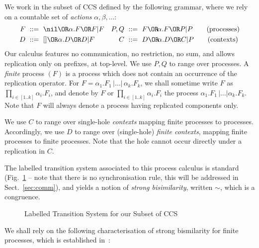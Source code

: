 \documentclass{llncs}
\begin{document}
We work in the subset of CCS defined by the following grammar, where
we rely on a countable set of \emph{actions} $\alpha,\beta,\dots$:
\begin{align*}
  F ~&::=~ \nil \OR \alpha.F \OR F|F &
  P,Q ~&::=~ F \OR \!\alpha.F \OR P|P \tag{processes}\\
  D ~&::=~ [] \OR \alpha.D \OR D|F &
  C ~&::=~ D \OR \!\alpha.D \OR C|P \tag{contexts}
\end{align*}
Our calculus features no communication, no restriction, no sum, and
allows replication only on prefixes, at top-level. We use $P,Q$ to
range over processes. A \emph{finite} process $(F)$ is a process which
does not contain an occurrence of the replication operator.
For $F=\alpha_1.F_1\,|\dots|\,\alpha_k.F_k$, we shall sometime write $F$ as
$\prod_{i\in[1..k]} \alpha_i.F_i$, and denote by $\!F$ or
$\prod_{i\in[1..k]} \!\alpha_i.F_i$ the process
$\!\alpha_1.F_1\,|\dots|\!\alpha_k.F_k$.
Note that $\!F$ will always denote a process having replicated
components only.

We use $C$ to range over single-hole \emph{contexts} mapping finite
processes to processes. Accordingly, we use $D$ to range over
(single-hole) \emph{finite contexts}, mapping finite processes to
finite processes. Note that the hole cannot occur directly under a
replication in $C$.


The labelled transition system associated to this process calculus is
standard (Fig.~\ref{fig:lts} -- note that there is no synchronisation
rule, this will be addressed in Sect.~\ref{sec:comm}), and
yields a notion of \emph{strong bisimilarity}, written $\sim$, which
is a congruence.
\begin{figure}[t]
  \centering
  \caption{Labelled Transition System for our Subset of CCS}
  \label{fig:lts}
\end{figure}



We shall rely on the following characterisation of strong bismilarity
for finite processes, which is established
in~\cite{hirschkoff:pous:lmcs:08}:
\end{document}
